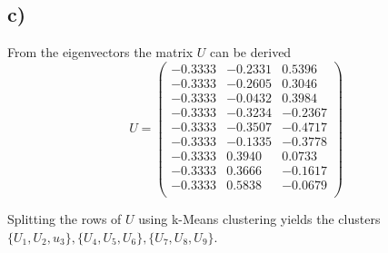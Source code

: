 \subsection*{c)}
From the eigenvectors the matrix $U$ can be derived\[U=\left(\begin{matrix}
-0.3333&  -0.2331&0.5396\\
-0.3333&	-0.2605&	0.3046\\
-0.3333&	-0.0432&	0.3984\\
-0.3333&	-0.3234&	-0.2367\\
-0.3333&	-0.3507&	-0.4717\\
-0.3333&	-0.1335&	-0.3778\\
-0.3333&	0.3940&	0.0733\\
-0.3333&	0.3666&	-0.1617\\
-0.3333&	0.5838&	-0.0679\\
\end{matrix}\right)\]

Splitting the rows of $U$ using k-Means clustering yields the clusters\\ $\lbrace U_1,U_2,u_3\rbrace,\lbrace U_4,U_5,U_6\rbrace,\lbrace U_7,U_8,U_9\rbrace$.